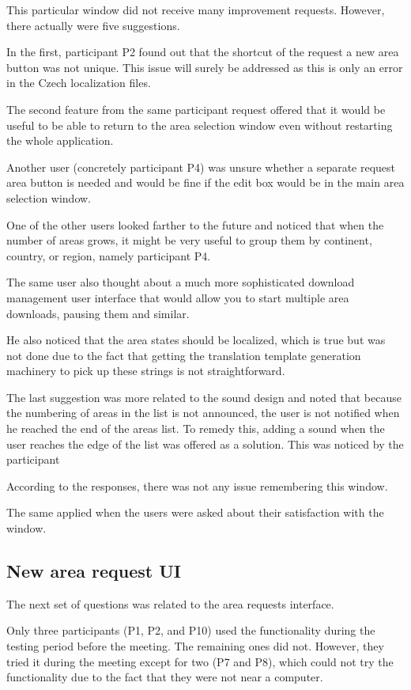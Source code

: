 \documentclass[nolof,digital]{fithesis3}
\begin{document}
This particular window did not receive many improvement requests. However, there actually were five suggestions.

In the first, participant P2 found out that the shortcut of the request a new area button was not unique. This issue will surely be addressed as this is only an error in the Czech localization files.

The second feature from the same participant request offered that it would be useful to be able to return to the area selection window even without restarting the whole application.

Another user (concretely participant P4) was unsure whether a separate request area button is needed and would be fine if the edit box would be in the main area selection window.

One of the other users looked farther to the future and noticed that when the number of areas grows, it might be very useful to group them by continent, country, or region, namely participant P4.

The same user also thought about a much more sophisticated download management user interface that would allow you to start multiple area downloads, pausing them and similar.

He also noticed that the area states should be localized, which is true but was not done due to the fact that getting the translation template generation machinery to pick up these strings is not straightforward.

The last suggestion was more related to the sound design and noted that because the numbering of areas in the list is not announced, the user is not notified when he reached the end of the areas list. To remedy this, adding a sound when the user reaches the edge of the list was offered as a solution. This was noticed by the participant 

According to the responses, there was not any issue remembering this window.

The same applied when the users were asked about their satisfaction with the window.
\subsection{New area request UI}
The next set of questions was related to the area requests interface.

Only three participants (P1, P2, and P10) used the functionality during the testing period before the meeting. The remaining ones did not. However, they tried it during the meeting except for two (P7 and P8), which could not try the functionality due to the fact that they were not near a computer.
\end{document}
